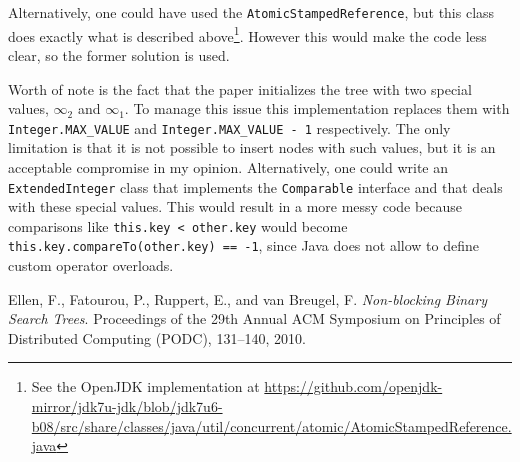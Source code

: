 \documentclass[a4paper,draft,12pt]{article}
\begin{document}
Alternatively, one could have used the \texttt{AtomicStampedReference}, but this class does exactly what is described above\footnote{See the OpenJDK implementation at \url{https://github.com/openjdk-mirror/jdk7u-jdk/blob/jdk7u6-b08/src/share/classes/java/util/concurrent/atomic/AtomicStampedReference.java}}. However this would make the code less clear, so the former solution is used.

Worth of note is the fact that the paper initializes the tree with two special values, $\infty_2$ and $\infty_1$. To manage this issue this implementation replaces them with \texttt{Integer.MAX\_VALUE} and \texttt{Integer.MAX\_VALUE - 1} respectively. The only limitation is that it is not possible to insert nodes with such values, but it is an acceptable compromise in my opinion. Alternatively, one could write an \texttt{ExtendedInteger} class that implements the \texttt{Comparable} interface and that deals with these special values. This would result in a more messy code because comparisons like \texttt{this.key < other.key} would become \texttt{this.key.compareTo(other.key) == -1}, since Java does not allow to define custom operator overloads.


\begin{thebibliography}{9}
     Ellen, F., Fatourou, P., Ruppert, E., and van Breugel, F. \emph{Non-blocking Binary Search Trees}. Proceedings of the 29th Annual ACM Symposium on Principles of Distributed Computing (PODC), 131–140, 2010.
\end{thebibliography}
\end{document}
